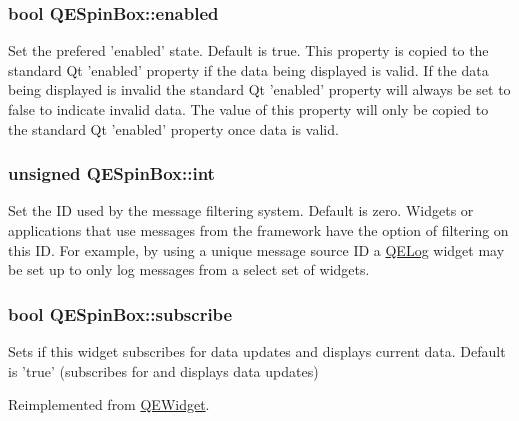 \hypertarget{classQESpinBox_a3b294d83e54061c1cccb9a5dffcc0ae9}{
\subsubsection[{enabled}]{\setlength{\rightskip}{0pt plus 5cm}bool QESpinBox::enabled}}
\label{classQESpinBox_a3b294d83e54061c1cccb9a5dffcc0ae9}
Set the prefered 'enabled' state. Default is true. This property is copied to the standard Qt 'enabled' property if the data being displayed is valid. If the data being displayed is invalid the standard Qt 'enabled' property will always be set to false to indicate invalid data. The value of this property will only be copied to the standard Qt 'enabled' property once data is valid. \hypertarget{classQESpinBox_aa205e7385b1f363dfb22541be9f9ba05}{
\subsubsection[{int}]{\setlength{\rightskip}{0pt plus 5cm}unsigned QESpinBox::int}}
\label{classQESpinBox_aa205e7385b1f363dfb22541be9f9ba05}
Set the ID used by the message filtering system. Default is zero. Widgets or applications that use messages from the framework have the option of filtering on this ID. For example, by using a unique message source ID a \hyperlink{classQELog}{QELog} widget may be set up to only log messages from a select set of widgets. \hypertarget{classQESpinBox_a276dd7add074e7112181bce690f336f0}{
\subsubsection[{subscribe}]{\setlength{\rightskip}{0pt plus 5cm}bool QESpinBox::subscribe}}
\label{classQESpinBox_a276dd7add074e7112181bce690f336f0}
Sets if this widget subscribes for data updates and displays current data. Default is 'true' (subscribes for and displays data updates) 

Reimplemented from \hyperlink{classQEWidget}{QEWidget}.

